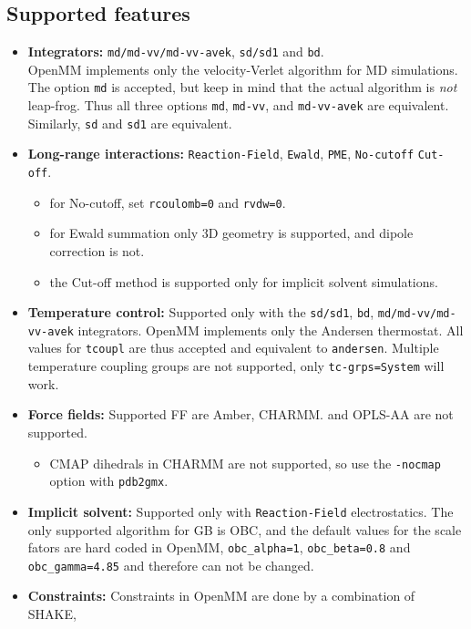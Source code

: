 \subsection{Supported features}\label{subsec:features}

\begin{itemize}
\item \textbf{Integrators:} {\tt md/md-vv/md-vv-avek}, {\tt sd/sd1} and {\tt bd}.\\
OpenMM implements only the velocity-Verlet algorithm for MD simulations.
The option {\tt md} is accepted, but keep in mind that the actual algorithm is \emph{not} leap-frog.
Thus all three options {\tt md}, {\tt md-vv}, and {\tt md-vv-avek} are equivalent.
Similarly, {\tt sd} and {\tt sd1} are equivalent.
\item \textbf{Long-range interactions:} {\tt Reaction-Field}, {\tt Ewald}, {\tt PME}, {\tt No-cutoff}
{\tt Cut-off}.
\begin{itemize}
\item for No-cutoff, set {\tt rcoulomb=0} and {\tt rvdw=0}.
\item for Ewald summation only 3D geometry is supported, and dipole correction is not.
\item the Cut-off method is supported only for implicit solvent simulations.
\end{itemize}
\item \textbf{Temperature control:} Supported only with the {\tt sd/sd1}, {\tt bd},
{\tt md/md-vv/md-vv-avek} integrators.
OpenMM implements only the Andersen thermostat. All values for {\tt tcoupl} are
thus accepted and equivalent to {\tt andersen}. Multiple temperature coupling groups
are not supported, only {\tt tc-grps=System} will work.
\item \textbf{Force fields:} Supported FF are Amber, CHARMM. {\gromos} and OPLS-AA are not supported.
\begin{itemize}
\item CMAP dihedrals in CHARMM are not supported, so use the {\tt -nocmap} option with {\tt pdb2gmx}.
\end{itemize}
\item \textbf{Implicit solvent:} Supported only with {\tt Reaction-Field} electrostatics.
The only supported algorithm for GB is OBC, and the default {\gromacs} values for the scale fators
are hard coded in OpenMM, {\ie} {\tt obc_alpha=1}, {\tt obc_beta=0.8} and {\tt obc_gamma=4.85} and 
therefore can not be changed.
\item \textbf{Constraints:} Constraints in OpenMM are done by a combination of SHAKE,

\end{itemize}
